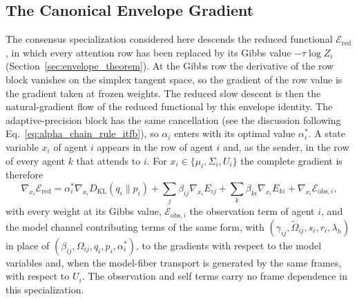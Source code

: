 \subsection*{The Canonical Envelope Gradient}

The consensus specialization considered here descends the reduced functional $\mathcal{E}_{\mathrm{red}}$, in which every attention row has been replaced by its Gibbs value $-\tau\log Z_i$ (Section~\ref{sec:envelope_theorem}). At the Gibbs row the derivative of the row block vanishes on the simplex tangent space, so the gradient of the row value is the gradient taken at frozen weights. The reduced slow descent is then the natural-gradient flow of the reduced functional by this envelope identity. The adaptive-precision block has the same cancellation (see the discussion following Eq.~\eqref{eq:alpha_chain_rule_itfb}), so $\alpha_i$ enters with its optimal value $\alpha_i^*$. A state variable $x_i$ of agent $i$ appears in the row of agent $i$ and, as the sender, in the row of every agent $k$ that attends to $i$. For $x_i \in \{\mu_i, \Sigma_i, U_i\}$ the complete gradient is therefore
\begin{equation}
\nabla_{x_i}\mathcal{E}_{\mathrm{red}} = \alpha_i^*\nabla_{x_i}D_{\mathrm{KL}}(q_i \| p_i) + \sum_j \beta_{ij}\nabla_{x_i}E_{ij} + \sum_k \beta_{ki}\nabla_{x_i}E_{ki} + \nabla_{x_i}\mathcal{E}_{\mathrm{obs},i},
\label{eq:canonical_gradient_general}
\end{equation}
with every weight at its Gibbs value, $\mathcal{E}_{\mathrm{obs},i}$ the observation term of agent $i$, and the model channel contributing terms of the same form, with $(\gamma_{ij}, \tilde\Omega_{ij}, s_i, r_i, \lambda_h)$ in place of $(\beta_{ij}, \Omega_{ij}, q_i, p_i, \alpha_i^*)$, to the gradients with respect to the model variables and, when the model-fiber transport is generated by the same frames, with respect to $U_i$. The observation and self terms carry no frame dependence in this specialization.

